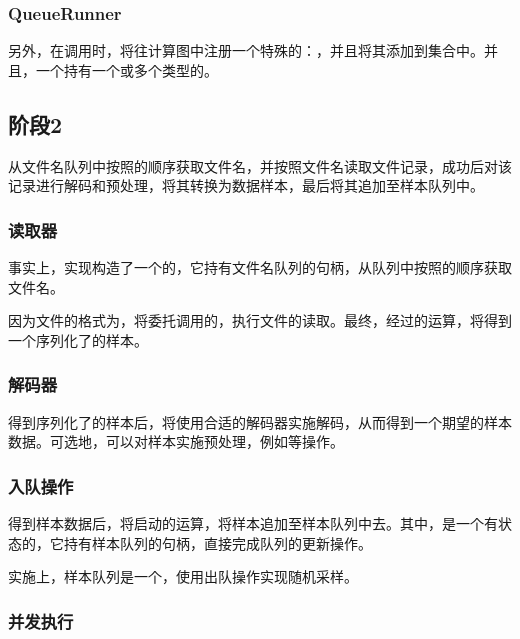\begin{content}
\subsubsection{QueueRunner}

另外，在调用时，将往计算图中注册一个特殊的：，并且将其添加到集合中。并且，一个持有一个或多个类型的。

\subsection{阶段2}

从文件名队列中按照的顺序获取文件名，并按照文件名读取文件记录，成功后对该记录进行解码和预处理，将其转换为数据样本，最后将其追加至样本队列中。

\subsubsection{读取器}

事实上，实现构造了一个的，它持有文件名队列的句柄，从队列中按照的顺序获取文件名。

因为文件的格式为，将委托调用的，执行文件的读取。最终，经过的运算，将得到一个序列化了的样本。

\subsubsection{解码器}

得到序列化了的样本后，将使用合适的解码器实施解码，从而得到一个期望的样本数据。可选地，可以对样本实施预处理，例如等操作。

\subsubsection{入队操作}

得到样本数据后，将启动的运算，将样本追加至样本队列中去。其中，是一个有状态的，它持有样本队列的句柄，直接完成队列的更新操作。

实施上，样本队列是一个，使用出队操作实现随机采样。

\subsubsection{并发执行}


\end{content}
